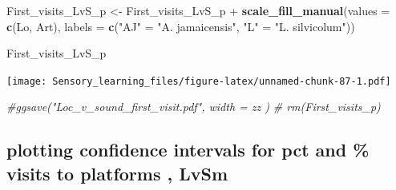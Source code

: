 \documentclass[]{article}
\newenvironment{Shaded}{\begin{snugshade}}{\end{snugshade}}
\newcommand{\KeywordTok}[1]{\textcolor[rgb]{0.13,0.29,0.53}{\textbf{{#1}}}}
\newcommand{\DataTypeTok}[1]{\textcolor[rgb]{0.13,0.29,0.53}{{#1}}}
\newcommand{\StringTok}[1]{\textcolor[rgb]{0.31,0.60,0.02}{{#1}}}
\newcommand{\CommentTok}[1]{\textcolor[rgb]{0.56,0.35,0.01}{\textit{{#1}}}}
\newcommand{\NormalTok}[1]{{#1}}
\begin{document}
\begin{Shaded}
\begin{Highlighting}[]
\NormalTok{First_visits_LvS_p  <-}\StringTok{ }\NormalTok{First_visits_LvS_p  +}\StringTok{ }\KeywordTok{scale_fill_manual}\NormalTok{(}\DataTypeTok{values =} \KeywordTok{c}\NormalTok{(Lo, Art), }\DataTypeTok{labels =} \KeywordTok{c}\NormalTok{(}\StringTok{"AJ"} \NormalTok{=}\StringTok{ "A. jamaicensis"}\NormalTok{, }\StringTok{"L"} \NormalTok{=}\StringTok{ "L. silvicolum"}\NormalTok{))}

\NormalTok{First_visits_LvS_p}
\end{Highlighting}
\end{Shaded}

\texttt{[image: Sensory\_learning\_files/figure-latex/unnamed-chunk-87-1.pdf]}

\begin{Shaded}
\begin{Highlighting}[]
  \CommentTok{#ggsave("Loc_v_sound_first_visit.pdf", width = zz  )}
 \CommentTok{# rm(First_visits_p)}
\end{Highlighting}
\end{Shaded}

\subsection{plotting confidence intervals for pct and \% visits to
platforms ,
LvSm}\label{plotting-confidence-intervals-for-pct-and-visits-to-platforms-lvsm-1}
\end{document}
